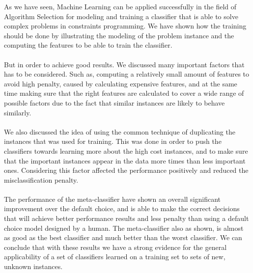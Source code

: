 As we have seen, Machine Learning can be applied successfully in the field of Algorithm Selection for modeling and training a classifier that is able to solve complex problems in constraints programming. We have shown how the training should be done by illustrating the modeling of the problem instance and the computing the features to be able to train the classifier.
\\\\
But in order to achieve good results. We discussed many important factors that has to be considered. Such as, computing a relatively small amount of features to avoid high penalty, caused by calculating expensive features, and at the same time making sure that the right features are calculated to cover a wide range of possible factors due to the fact that similar instances are likely to behave similarly.
\\\\
We also discussed the idea of using the common technique of duplicating the instances that was used for training.
This was done in order to push the classifiers towards learning more about the high cost instances, and to make sure that the important instances appear in the data more times than less important ones. Considering this factor affected the performance positively and reduced the misclassification penalty.
\\\\
The performance of the meta-classifier have shown an overall significant improvement over the default choice, and is able to make the correct decisions that will achieve better performance results and less penalty than using a default choice model designed by a human. The meta-classifier also as shown, is almost as good as the best classifier and much better than the worst classifier. We can conclude that with these results we have a strong evidence for the general applicability of a set of classifiers learned on a training set to sets of new, unknown instances\cite{ml:csd}.
